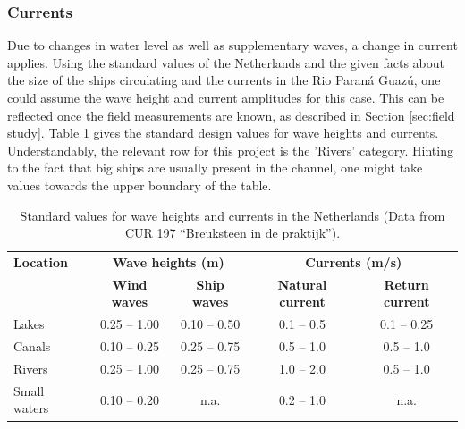 \subsubsection{Currents}

Due to changes in water level as well as supplementary waves, a change in current applies. Using the standard values of the Netherlands and the given facts about the size of the ships circulating and the currents in the Rio Paraná Guazú, one could assume the wave height and current amplitudes for this case. This can be reflected once the field measurements are known, as described in Section \ref{sec:field study}.
Table \ref{tab:standard_values} gives the standard design values for wave heights and currents. Understandably, the relevant row for this project is the 'Rivers' category. Hinting to the fact that big ships are usually present in the channel, one might take values towards the upper boundary of the table.

\begin{table}[H]
    \centering
    \caption{Standard values for wave heights and currents in the Netherlands (Data from CUR 197 ``Breuksteen in de praktijk'').}
    \label{tab:standard_values}
    \begin{tabular}{lcccc}
        \toprule
        \textbf{Location} & \multicolumn{2}{c}{\textbf{Wave heights (m)}} & \multicolumn{2}{c}{\textbf{Currents (m/s)}} \\
        \cmidrule(lr){2-3} \cmidrule(l){4-5}
        & \textbf{Wind waves} & \textbf{Ship waves} & \textbf{Natural current} & \textbf{Return current} \\
        \midrule
        Lakes          & 0.25 -- 1.00  & 0.10 -- 0.50  & 0.1 -- 0.5  & 0.1 -- 0.25 \\
        Canals         & 0.10 -- 0.25  & 0.25 -- 0.75  & 0.5 -- 1.0  & 0.5 -- 1.0  \\
        Rivers         & 0.25 -- 1.00  & 0.25 -- 0.75  & 1.0 -- 2.0  & 0.5 -- 1.0  \\
        Small waters   & 0.10 -- 0.20  & n.a.          & 0.2 -- 1.0  & n.a.       \\
        \bottomrule
    \end{tabular}
\end{table}


